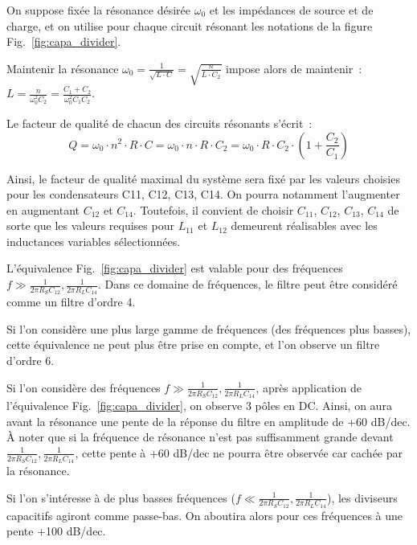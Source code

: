 \documentclass{article}
\begin{document}

On suppose fixée la résonance désirée $\omega_0$ et les impédances de source et de charge, et on utilise pour chaque circuit résonant les notations de la figure Fig.~\ref{fig:capa_divider}.

Maintenir la résonance ${\omega_0 = \frac{1}{\sqrt{L\cdot C}} = \sqrt{\frac{n}{L\cdot C_2}}}$ impose alors de maintenir~: ${L = \frac{n}{\omega_0^2 C_2} =\frac{C_1+C_2}{\omega_0^2 C_1 C_2}}$.


Le facteur de qualité de chacun des circuits résonants s'écrit~: 
\begin{equation*}
Q = \omega_0\cdot n^2\cdot R\cdot C = \omega_0\cdot n\cdot R\cdot C_2 = \omega_0\cdot R\cdot C_2\cdot (1+\frac{C_2}{C_1})
\end{equation*}

Ainsi, le facteur de qualité maximal du système sera fixé par les valeurs choisies pour les condensateurs C11, C12, C13, C14. On pourra notamment l'augmenter en augmentant $C_{12}$ et $C_{14}$. Toutefois, il convient de choisir $C_{11}$, $C_{12}$, $C_{13}$, $C_{14}$ de sorte que les valeurs requises pour $L_{11}$ et $L_{12}$ demeurent réalisables avec les inductances variables sélectionnées.




L'équivalence Fig.~\ref{fig:capa_divider} est valable pour des fréquences ${f \gg \frac{1}{2\pi R_S C_{12}}, \frac{1}{2\pi R_L C_{14}}}$. Dans ce domaine de fréquences, le filtre peut être considéré comme un filtre d'ordre 4.

Si l'on considère une plus large gamme de fréquences (des fréquences plus basses), cette équivalence ne peut plus être prise en compte, et l'on observe un filtre d'ordre 6.



Si l'on considère des fréquences ${f \gg \frac{1}{2\pi R_S C_{12}}, \frac{1}{2\pi R_L C_{14}}}$, après application de l'équivalence Fig.~\ref{fig:capa_divider}, on observe 3 pôles en DC. Ainsi, on aura avant la résonance une pente de la réponse du filtre en amplitude de +60 dB/dec. À noter que si la fréquence de résonance n'est pas suffisamment grande devant ${\frac{1}{2\pi R_S C_{12}}, \frac{1}{2\pi R_L C_{14}}}$, cette pente à +60 dB/dec ne pourra être observée car cachée par la résonance.

Si l'on s'intéresse à de plus basses fréquences (${f \ll \frac{1}{2\pi R_S C_{12}}, \frac{1}{2\pi R_L C_{14}}}$), les diviseurs capacitifs agiront comme passe-bas. On aboutira alors pour ces fréquences à une pente +100 dB/dec.
\end{document}
